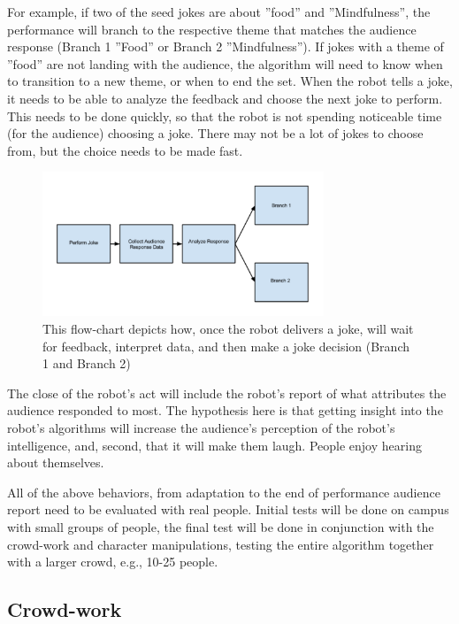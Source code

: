 \documentclass[onecolumn, draftclsnofoot,10pt, compsoc]{IEEEtran}
\begin{document}
For example, if two of the seed jokes are about ”food” and ”Mindfulness”, the performance will branch to the
respective theme that matches the audience response (Branch 1 ”Food” or Branch 2 ”Mindfulness”). If jokes with a
theme of ”food” are not landing with the audience, the algorithm will need to know when to transition to a new theme, or when to end the set. When the robot tells a joke, it needs to be able to analyze the feedback and choose the next joke
to perform. This needs to be done quickly, so that the robot is not spending noticeable time (for the audience) choosing
a joke. There may not be a lot of jokes to choose from, but the choice needs to be made fast.

\begin{figure}[H]
  \centering
  \includegraphics[width=0.75\textwidth,height=0.75\textheight,keepaspectratio]{fig1}
  \caption{ This flow-chart depicts how, once the robot delivers a joke, will wait for feedback, interpret data, and then make a joke decision (Branch 1 and Branch 2)}
  \label{fig:process}
\end{figure}

The close of the robot’s act will include the robot’s report of what attributes the audience
responded to most. The hypothesis here is that getting insight into the robot’s algorithms will increase the audience’s
perception of the robot’s intelligence, and, second, that it will make them laugh. People enjoy hearing about themselves.

All of the above behaviors, from adaptation to the end of performance audience report need to be evaluated with
real people. Initial tests will be done on campus with small groups of people, the final test will be done in conjunction
with the crowd-work and character manipulations, testing the entire algorithm together with a larger crowd, e.g., 10-25
people.


\subsection{Crowd-work}
\end{document}
